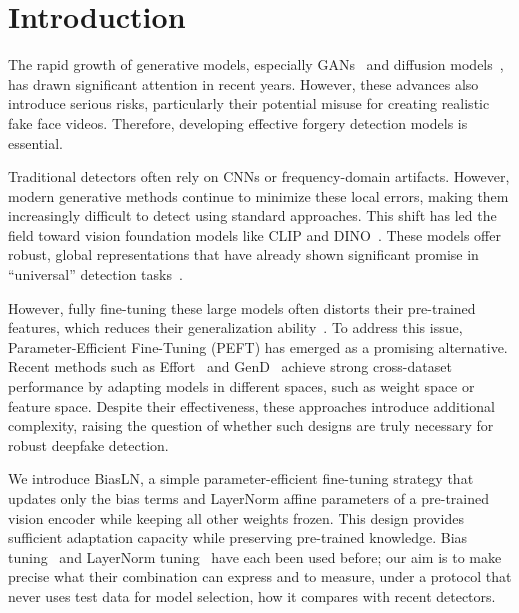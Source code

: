 \documentclass[fonts]{icst}
\newif\ifrevmark\revmarkfalse
\newcommand{\rev}[1]{\ifrevmark{\color{revblue}#1}\else#1\fi}
\begin{document}
\maketitle

\section{Introduction}
The rapid growth of generative models, especially GANs~\cite{goodfellow2020gan} and diffusion models~\cite{yang2022diffusion}, has drawn significant attention in recent years. However, these advances also introduce serious risks, particularly their potential misuse for creating realistic fake face videos. Therefore, developing effective forgery detection models is essential.

Traditional detectors often rely on CNNs or frequency-domain artifacts. However, modern generative methods continue to minimize these local errors, making them increasingly difficult to detect using standard approaches.
This shift has led the field toward vision foundation models like CLIP and DINO~\cite{radford2021clip_vitl,caron2021emerging}.
These models offer robust, global representations that have already shown significant promise in ``universal'' detection tasks~\cite{ojha2023universal}.

However, fully fine-tuning these large models often \rev{distorts their pre-trained features}, which reduces their generalization ability~\cite{kumar2022finetuning}.
To address this issue, Parameter-Efficient Fine-Tuning (PEFT) has emerged as a promising alternative. Recent methods such as Effort~\cite{yan2025effort} and GenD~\cite{yermakov2025gend} achieve strong cross-dataset performance by adapting models in different spaces, such as weight space or feature space.
Despite their effectiveness, these approaches introduce additional complexity, raising the question of whether such designs are truly necessary for robust deepfake detection.

We introduce BiasLN, a simple parameter-efficient fine-tuning strategy that updates only the bias terms and LayerNorm affine parameters of a pre-trained vision encoder while keeping all other weights frozen. This design provides sufficient adaptation capacity while preserving pre-trained knowledge. \rev{Bias tuning~\cite{benzaken2022bitfit} and LayerNorm tuning~\cite{wang2022ln,yermakov2025gend} have each been used before; our aim is to make precise what their combination can express and to measure, under a protocol that never uses test data for model selection, how it compares with recent detectors.}
\end{document}
